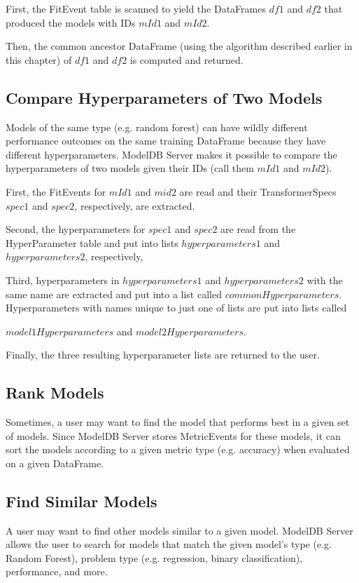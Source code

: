 First, the FitEvent table is scanned to yield the DataFrames $df1$ and $df2$
that produced the models with IDs $mId1$ and $mId2$.

Then, the common ancestor DataFrame (using the algorithm described earlier in
this chapter) of $df1$ and $df2$ is computed and returned.

\subsection{Compare Hyperparameters of Two Models}
Models of the same type (e.g. random forest) can have wildly different performance
outcomes on the same training DataFrame because they have different hyperparameters.
ModelDB Server makes it possible to compare the hyperparameters of two models given their
IDs (call them $mId1$ and $mId2$).

First, the FitEvents for $mId1$ and $mid2$ are read and their TransformerSpecs $spec1$ and
$spec2$, respectively, are extracted.

Second, the hyperparameters for $spec1$ and $spec2$ are read from the HyperParameter table
and put into lists $hyperparameters1$ and $hyperparameters2$, respectively,

Third, hyperparameters in $hyperparameters1$ and $hyperparameters2$ with the same name are
extracted and put into a list called $commonHyperparameters$. Hyperparameters with names unique to just
one of lists are put into lists called 

$model1Hyperparameters$ and $model2Hyperparameters$.

Finally, the three resulting hyperparameter lists are
returned to the user.

\subsection{Rank Models}
Sometimes, a user may want to find the model that performs best in a given set of
models. Since ModelDB Server stores MetricEvents for these models, it can sort the models
according to a given metric type (e.g. accuracy) when evaluated on a given DataFrame.

\subsection{Find Similar Models}
A user may want to find other models similar to a given model. ModelDB Server
allows the user to search for models that match the given model's type (e.g. 
Random Forest), problem type (e.g. regression, binary classification), performance,
and more.

